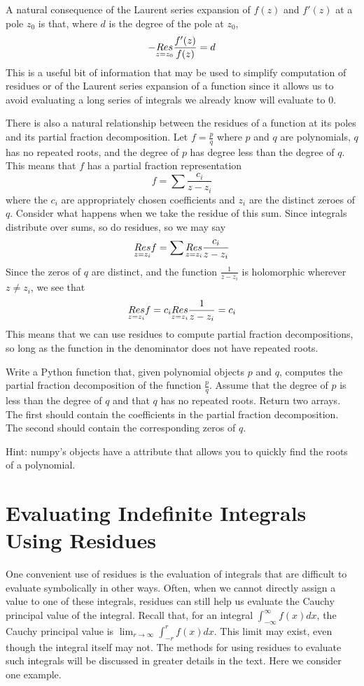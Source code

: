 A natural consequence of the Laurent series expansion of $f(z)$ and $f'(z)$ at a pole $z_0$ is that, where $d$ is the degree of the pole at $z_0$,
\[- \underset{z=z_0}{Res} \frac{f'(z)}{f(z)} = d\]
This is a useful bit of information that may be used to simplify computation of residues or of the Laurent series expansion of a function since it allows us to avoid evaluating a long series of integrals we already know will evaluate to $0$.

There is also a natural relationship between the residues of a function at its poles and its partial fraction decomposition.
Let $f = \frac{p}{q}$ where $p$ and $q$ are polynomials, $q$ has no repeated roots, and the degree of $p$ has degree less than the degree of $q$.
This means that $f$ has a partial fraction representation
\[f = \sum \frac{c_i}{z - z_i}\]
where the $c_i$ are appropriately chosen coefficients and $z_i$ are the distinct zeroes of $q$.
Consider what happens when we take the residue of this sum.
Since integrals distribute over sums, so do residues, so we may say
\[\underset{z=z_i}{Res} f = \sum \underset{z=z_i}{Res} \frac{c_i}{z - z_i}\]
Since the zeros of $q$ are distinct, and the function $\frac{1}{z - z_i}$ is holomorphic wherever $z \neq z_i$, we see that
\[\underset{z=z_i}{Res} f = c_i \underset{z=z_i}{Res} \frac{1}{z-z_i} = c_i\]
This means that we can use residues to compute partial fraction decompositions, so long as the function in the denominator does not have repeated roots.

\begin{problem}
Write a Python function that, given polynomial objects $p$ and $q$, computes the partial fraction decomposition of the function $\frac{p}{q}$.
Assume that the degree of $p$ is less than the degree of $q$ and that $q$ has no repeated roots.
Return two arrays.
The first should contain the coefficients in the partial fraction decomposition.
The second should contain the corresponding zeros of $q$.

Hint: numpy's  objects have a  attribute that allows you to quickly find the roots of a polynomial.
\end{problem}

\section*{Evaluating Indefinite Integrals Using Residues}

One convenient use of residues is the evaluation of integrals that are difficult to evaluate symbolically in other ways.
Often, when we cannot directly assign a value to one of these integrals, residues can still help us evaluate the Cauchy principal value of the integral.
Recall that, for an integral $\int_{-\infty}^{\infty} f(x)dx$, the Cauchy principal value is $\lim_{r\to \infty} \int_{-r}^{r} f(x) dx$.
This limit may exist, even though the integral itself may not.
The methods for using residues to evaluate such integrals will be discussed in greater details in the text.
Here we consider one example.

